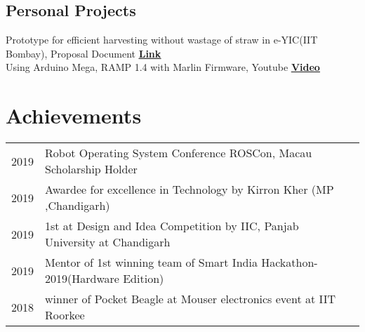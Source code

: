 \documentclass[]{font}
\begin{document}
\begin{minipage}[t]{0.69\textwidth}

\subsection{Personal Projects}
\textbullet{} Prototype for efficient harvesting without wastage of straw in e-YIC(IIT Bombay), Proposal Document \underline{\textbf{\href{https://drive.google.com/file/d/0B0cF1Lq6c1cPcURJdkJjQmVFcFk3eTgtTGg5VktPVHJWWU5R/view?usp=sharing}{Link}}}  \\
\vspace{\topsep} %
\textbullet{} Using Arduino Mega, RAMP 1.4 with Marlin Firmware, Youtube \textbf{\href{https://www.youtube.com/watch?v=D679CJQNnKo&t=1s}{\underline{Video}}}
\sectionsep



\section{Achievements} 
\begin{tabular}{rll}
2019         & Robot Operating System Conference ROSCon, Macau Scholarship Holder\\
2019         & Awardee for excellence in Technology by Kirron Kher (MP ,Chandigarh)\\
2019         & 1st at Design and Idea Competition by IIC, Panjab University at Chandigarh \\  
2019         & Mentor of 1st winning team of Smart India Hackathon-2019(Hardware Edition)\\ 
2018	     & winner of Pocket Beagle at Mouser electronics event at IIT Roorkee \\
\end{tabular}
\sectionsep


\end{minipage} 
\end{document}
